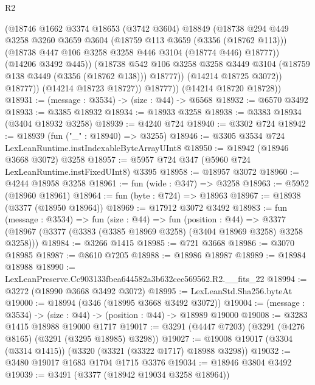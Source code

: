\begin{lexlean}{R2}
\begin{coremodule}
                    (@18746
                      @1662
                      @3374
                      @18653
                      (@3742 @3604)
                      @18849
                      (@18738
                        @294
                        @449
                        @3258
                        @3260
                        @3659
                        @3604
                        (@18759 @113 @3659 (@3356 (@18762 @113)))
                        (@18738 @447 @106 @3258 @3258 @446 @3104 (@18774 @446) @18777))
                      (@14206 @3492 @445))
                    (@18738
                      @542
                      @106
                      @3258
                      @3258
                      @3449
                      @3104
                      (@18759 @138 @3449 (@3356 (@18762 @138)))
                      @18777))
                  (@14214 @18725 @3072))
                @18777))
            (@14214 @18723 @18727))
          @18777))
      (@14214 @18720 @18728))
@18931 := (message : @3534) -> (size : @44) -> @6568
@18932 := @6570 @3492
@18933 := @3385 @18932
@18934 := @18933 @3258
@18938 := @3383 @18934 (@3404 @18932 @3258)
@18939 := @4240 @724
@18940 := @3302 @724
@18942 := @18939 (fun ("_" : @18940) => @3255)
@18946 := @3305 @3534 @724 LexLeanRuntime.instIndexableByteArrayUInt8
@18950 := @18942 (@18946 @3668 @3072) @3258
@18957 := @5957 @724 @347 (@5960 @724 LexLeanRuntime.instFixedUInt8) @3395
@18958 := @18957 @3072
@18960 := @4244 @18958 @3258
@18961 := fun (wide : @347) => @3258
@18963 := @5952 (@18960 @18961)
@18964 := fun (byte : @724) => @18963
@18967 := @18938 (@3377 (@18950 @18964))
@18969 := @17912 @3072 @3492
@18983 := fun (message : @3534) =>
  fun (size : @44) =>
  fun (position : @44) =>
  @3377 (@18967 (@3377 (@3383 (@3385 @18969 @3258) (@3404 @18969 @3258) @3258 @3258)))
@18984 := @3266 @1415
@18985 := @721 @3668
@18986 := @3070 @18985
@18987 := @8610 @7205
@18988 := @18986 @18987
@18989 := @18984 @18988
@18990 := LexLeanPreserve.Cc903133fbea644582a3b632cec569562.R2.__fits_22
@18994 := @3272 (@18990 @3668 @3492 @3072)
@18995 := LexLeanStd.Sha256.byteAt
@19000 := @18994 (@346 (@18995 @3668 @3492 @3072))
@19004 := (message : @3534) -> (size : @44) -> (position : @44) -> @18989 @19000
@19008 := @3283 @1415 @18988 @19000 @1717
@19017 := @3291 (@4447 @7203) (@3291 (@4276 @8165) (@3291 (@3295 @18985) @3298))
@19027 := @19008 @19017 (@3304 (@3314 @1415)) (@3320 (@3321 (@3322 @1717) @18988 @3298))
@19032 := @3480 @19017 @1683 @1704 @1715 @3376
@19034 := @18946 @3804 @3492
@19039 := @3491 (@3377 (@18942 @19034 @3258 @18964))

\end{coremodule}
\end{lexlean}
